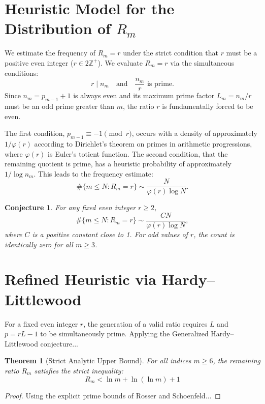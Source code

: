 \documentclass[11pt,fleqn]{article}
\newtheorem{theorem}{Theorem}
\newtheorem{conjecture}{Conjecture}
\begin{document}
\section{Heuristic Model for the Distribution of $R_m$}
We estimate the frequency of $R_m = r$ under the strict condition that $r$ must be a positive even integer ($r \in 2\mathbb{Z}^+$). We evaluate $R_m = r$ via the simultaneous conditions:
\begin{equation*}
    r \mid n_m \quad \text{and} \quad \frac{n_m}{r} \text{ is prime.}
\end{equation*}
Since $n_m = p_{m-1}+1$ is always even and its maximum prime factor $L_m = n_m/r$ must be an odd prime greater than $m$, the ratio $r$ is fundamentally forced to be even. 

The first condition, $p_{m-1} \equiv -1 \pmod r$, occurs with a density of approximately $1/\varphi(r)$ according to Dirichlet's theorem on primes in arithmetic progressions, where $\varphi(r)$ is Euler's totient function. The second condition, that the remaining quotient is prime, has a heuristic probability of approximately $1/\log n_m$. This leads to the frequency estimate:
\begin{equation*}
    \#\{m \leq N : R_m = r\} \sim \frac{N}{\varphi(r) \log N}.
\end{equation*}

\begin{conjecture}
For any fixed even integer $r \geq 2$,
\begin{equation*}
    \#\{m \leq N : R_m = r\} \sim \frac{C N}{\varphi(r) \log N},
\end{equation*}
where $C$ is a positive constant close to 1. For odd values of $r$, the count is identically zero for all $m \geq 3$.
\end{conjecture}

\section{Refined Heuristic via Hardy--Littlewood}
For a fixed even integer $r$, the generation of a valid ratio requires $L$ and $p = rL - 1$ to be simultaneously prime. Applying the Generalized Hardy--Littlewood conjecture...

\begin{theorem}[Strict Analytic Upper Bound]
For all indices $m \geq 6$, the remaining ratio $R_m$ satisfies the strict inequality:
\begin{equation}
    R_m < \ln m + \ln(\ln m) + 1
\end{equation}
\end{theorem}
\begin{proof}
Using the explicit prime bounds of Rosser and Schoenfeld...
\end{proof}
\end{document}
